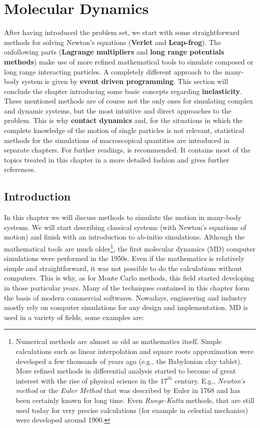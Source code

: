 \chapter{Molecular Dynamics}

\small
After having introduced the problem set, we start with some straightforward methods for solving Newton's equations (\textbf{Verlet} and \textbf{Leap-frog}). The onfollowing parts (\textbf{Lagrange multipliers} and \textbf{long range potentials methods}) make use of more refined mathematical tools to simulate composed or long range interacting particles. A completely different approach to the many-body system is given by \textbf{event driven programming}. This section will conclude the chapter introducing some basic concepts regarding \textbf{inelasticity}. These mentioned methods are of course not the only ones for simulating complex and dynamic systems, but the most intuitive and direct approaches to the problem. This is why \textbf{contact dynamics} and, for the situations in which the complete knowledge of the motion of single particles is not relevant, statistical methods for the simulations of macroscopical quantities are introduced in separate chapters. For further readings,  \citet{sim_liq} is recommended. It contains most of the topics treated in this chapter in a more detailed fashion and gives further references. 

\normalsize
\section{Introduction}

In this chapter we will discuss methods to simulate the motion in many-body systems. We will start describing classical systems (with Newton's equations of motion) and finish with an introduction to ab-initio simulations. Although the mathematical tools are much older\footnote{Numerical methods are almost as old as mathematics itself. Simple calculations such as linear interpolation and square roots approximation were developed a few thousands of years ago (e.g., the Babylonian clay tablet). More refined methods in differential analysis started to become of great interest with the rise of physical science in the $17^{th}$ century. E.g., \emph{Newton's method} or the \emph{Euler Method} that was described by Euler in 1768 and has been certainly known for long time. Even \emph{Runge-Kutta} methods, that are still used today for very precise calculations (for example in celestial mechanics) were developed around 1900.}, the first molecular dynamics (MD) computer simulations were performed in the 1950s. Even if the mathematics is relatively simple and straightforward, it was not possible to do the calculations without computers. This is why, as for Monte Carlo methods, this field started developing in those particular years. Many of the techniques contained in this chapter form the basis of modern commercial softwares. Nowadays, engineering and industry mostly rely on computer simulations for any design and implementation. MD is used in a variety of fields, some examples are:


